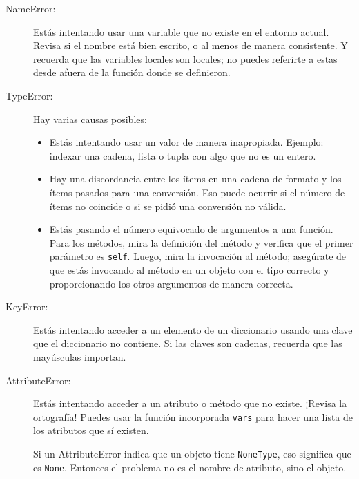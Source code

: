 \documentclass[10pt]{book}
\begin{document}
\begin{description}

\item[NameError:]  Estás intentando usar una variable que no
existe en el entorno actual.  Revisa si el nombre
está bien escrito, o al menos de manera consistente.
Y recuerda que las variables locales son locales; 
no puedes referirte a estas desde afuera de la función donde se definieron.

\item[TypeError:] Hay varias causas posibles:

\begin{itemize}

\item  Estás intentando usar un valor de manera inapropiada.  Ejemplo: indexar
una cadena, lista o tupla con algo que no es un entero.

\item Hay una discordancia entre los ítems en una cadena de formato y
los ítems pasados para una conversión.  Eso puede ocurrir si el número
de ítems no coincide o si se pidió una conversión no válida.

\item Estás pasando el número equivocado de argumentos a una función.
Para los métodos, mira la definición del método y
verifica que el primer parámetro es {\tt self}.  Luego, mira la
invocación al método; asegúrate de que estás invocando al método en un
objeto con el tipo correcto y proporcionando los otros argumentos
de manera correcta.

\end{itemize}

\item[KeyError:]  Estás intentando acceder a un elemento de un diccionario
usando una clave que el diccionario no contiene.  Si las claves
son cadenas, recuerda que las mayúsculas importan.

\item[AttributeError:] Estás intentando acceder a un atributo o método
  que no existe.  ¡Revisa la ortografía!  Puedes usar la función
  incorporada {\tt vars} para hacer una lista de los atributos que sí existen.

Si un AttributeError indica que un objeto tiene {\tt NoneType},
eso significa que es {\tt None}.  Entonces el problema no es el
nombre de atributo, sino el objeto.


\end{description}
\end{document}
